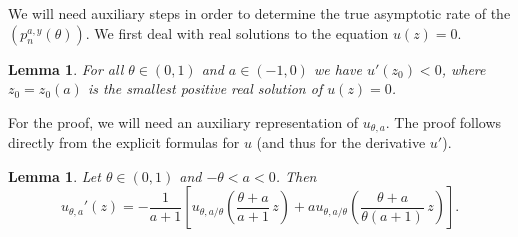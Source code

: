 \documentclass[12pt]{article}
\newcommand{\1}{\mathds{1}}
\theoremstyle{definition}
\theoremstyle{plain}
\newtheorem{Lemma}[definition]{Lemma}
\theoremstyle{remark}
\begin{document}
We will need auxiliary steps in order to determine the true asymptotic rate of the $(p_n^{a,y}(\theta))$. We first deal with real solutions to the equation $u(z)=0$.

\begin{Lemma}\label{orange_F_monoton}
    For all $\theta\in(0,1)$ and $a\in(-1,0)$ we have $u'(z_0)< 0$, where $z_0=z_0(a)$ is the smallest positive real solution of $u(z)=0$.
\end{Lemma}


For the proof, we will need an auxiliary representation of $u_{\theta,a}$. The proof follows directly from the explicit formulas for $u$ (and thus for the derivative $u'$).

\begin{Lemma}
Let $\theta\in(0,1)$ and $-\theta < a < 0$. Then
\begin{equation} \label{eqn:orangerepresentationuprime}
u_{\theta,a}'(z) = - \frac{1}{a+1} \left[ u_{\theta,a/\theta}\left( \frac{\theta+a}{a+1} \, z\right)+a u_{\theta,a/\theta}\left( \frac{\theta+a}{\theta(a+1)} \, z\right)\right].
\end{equation}
\end{Lemma}
\end{document}
